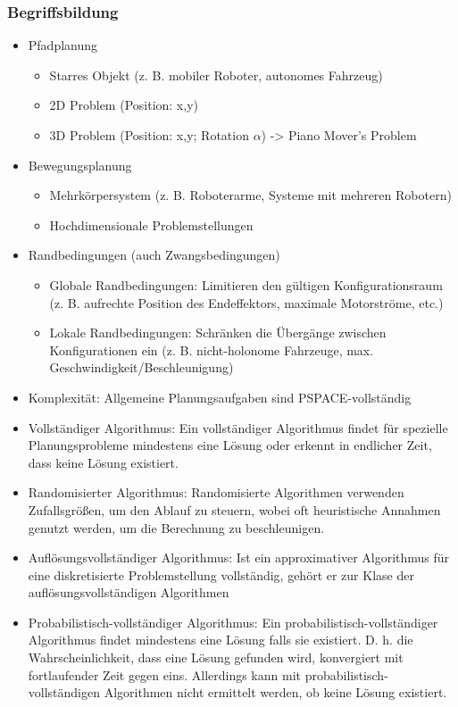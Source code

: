 \documentclass[paper=a4, fontsize=11pt]{scrartcl} %
\numberwithin{equation}{section} %
\numberwithin{figure}{section} %
\numberwithin{table}{section} %
\begin{document}
\subsubsection{Begriffsbildung}

\begin{itemize}
\item Pfadplanung
\begin{itemize}
\item Starres Objekt (z. B. mobiler Roboter, autonomes Fahrzeug)
\item 2D Problem (Position: x,y)
\item 3D Problem (Position: x,y; Rotation $\alpha$) -> Piano Mover's Problem
\end{itemize}
\item Bewegungsplanung
\begin{itemize}
\item Mehrkörpersystem (z. B. Roboterarme, Systeme mit mehreren Robotern)
\item Hochdimensionale Problemstellungen
\end{itemize}
\item Randbedingungen (auch Zwangsbedingungen)
\begin{itemize}
\item Globale Randbedingungen: Limitieren den gültigen Konfigurationsraum (z. B. aufrechte Position des Endeffektors, maximale Motorströme, etc.)
\item Lokale Randbedingungen: Schränken die Übergänge zwischen Konfigurationen ein (z. B. nicht-holonome Fahrzeuge, max. Geschwindigkeit/Beschleunigung)
\end{itemize}
\item Komplexität: Allgemeine Planungsaufgaben sind PSPACE-vollständig
\item Vollständiger Algorithmus: Ein vollständiger Algorithmus findet für spezielle Planungsprobleme mindestens eine Lösung oder erkennt in endlicher Zeit, dass keine Lösung existiert.
\item Randomisierter Algorithmus: Randomisierte Algorithmen verwenden Zufallsgrößen, um den Ablauf zu steuern, wobei oft heuristische Annahmen genutzt werden, um die Berechnung zu beschleunigen.
\item Auflösungsvollständiger Algorithmus: Ist ein approximativer Algorithmus für eine diskretisierte Problemstellung vollständig, gehört er zur Klase der auflösungsvollständigen Algorithmen
\item Probabilistisch-vollständiger Algorithmus: Ein probabilistisch-vollständiger Algorithmus findet mindestens eine Lösung falls sie existiert. D. h. die Wahrscheinlichkeit, dass eine Lösung gefunden wird, konvergiert mit fortlaufender Zeit gegen eins. Allerdings kann mit probabilistisch-vollständigen Algorithmen nicht ermittelt werden, ob keine Lösung existiert.
\end{itemize}
\end{document}
